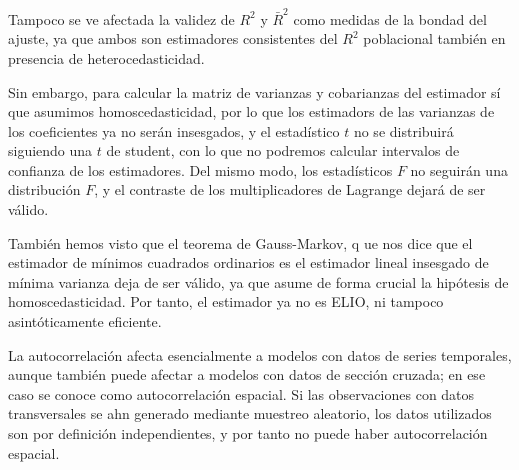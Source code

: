 Tampoco se ve afectada la validez de $R^2$ y $\bar{R}^2$ como medidas de la bondad del ajuste, ya que ambos son estimadores consistentes del $R^2$ poblacional tambi\'en en presencia de heterocedasticidad.

Sin embargo, para calcular la matriz de varianzas y cobarianzas del estimador s\'i que asumimos homoscedasticidad, por lo que los estimadors de las varianzas de los coeficientes ya no ser\'an insesgados, y el estad\'istico $t$ no se distribuir\'a siguiendo una $t$ de student, con lo que no podremos calcular intervalos de confianza de los estimadores. Del mismo modo, los estad\'isticos $F$ no seguir\'an una distribuci\'on $F$, y el contraste de los multiplicadores de Lagrange dejar\'a de ser v\'alido.

Tambi\'en hemos visto que el teorema de Gauss-Markov, q	ue nos dice que el estimador de m\'inimos cuadrados ordinarios es el estimador lineal insesgado de m\'inima varianza deja de ser v\'alido, ya que asume de forma crucial la hip\'otesis de homoscedasticidad. Por tanto, el estimador ya no es ELIO, ni tampoco asint\'oticamente eficiente.


La autocorrelaci\'on afecta esencialmente a modelos con datos de series temporales, aunque tambi\'en puede afectar a modelos con datos de secci\'on cruzada; en ese caso se conoce como autocorrelaci\'on espacial. Si las observaciones con datos transversales se ahn generado mediante muestreo aleatorio, los datos utilizados son por definici\'on independientes, y por tanto no puede haber autocorrelaci\'on espacial.

